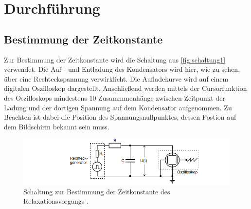 \section{Durchführung}
\label{sec:Durchführung}
\subsection{Bestimmung der Zeitkonstante}
Zur Bestimmung der Zeitkonstante wird die Schaltung aus \autoref{fig:schaltung1} verwendet. Die Auf - und Entladung des Kondensators wird 
hier, wie zu sehen, über eine Rechteckspannung verwirklicht. Die Aufladekurve wird auf einem digitalen Oszilloskop dargestellt. Anschließend
werden mittels der Cursorfunktion des Oszilloskops mindestens 10 Zusammmenhänge zwischen Zeitpunkt der Ladung und der dortigen Spannung
auf dem Kondensator aufgenommen. Zu Beachten ist dabei die Position des Spannungsnullpunktes, dessen Postion auf dem Bildschirm bekannt sein muss.
\begin{figure}
    \centering
    \includegraphics[width=\textwidth]{content/schaltung1.png}
    \caption{Schaltung zur Bestimmung der Zeitkonstante des Relaxationsvorgangs \cite[281]{v353}.}
    \label{fig:schaltung1}
\end{figure}

